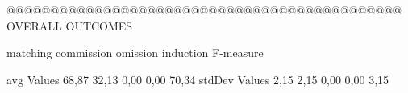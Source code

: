 @@@@@@@@@@@@@@@@@@@@@@@@@@@@@@@@@@@@@@@@@@@@@ OVERALL OUTCOMES

                matching commission   omission  induction    F-measure   

avg Values      68,87      32,13       0,00      0,00        70,34      
stdDev Values   2,15       2,15       0,00      0,00         3,15




